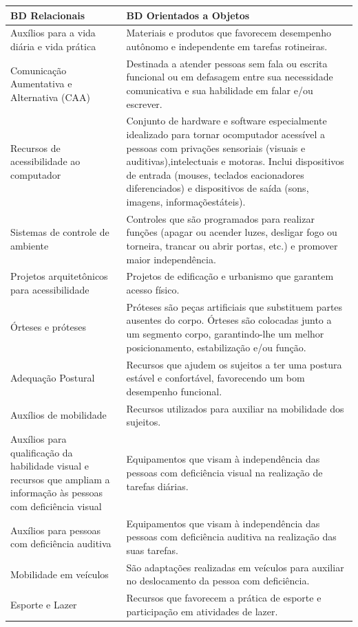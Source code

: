 \documentclass[
	12pt,			%
	openright,		%
	oneside,			%
	a4paper,			%
	chapter=TITLE,		%
	english,			%
	brazil,			%
	]{abntex2}
\begin{document}
{\centering
\footnotesize
\begin{tabular}{|p{7cm}|p{7cm}|}
\hline
\textbf{BD Relacionais} & \textbf{BD Orientados a Objetos} \\
\hline
Auxílios para a vida diária e vida prática & Materiais e produtos que favorecem desempenho autônomo e independente em tarefas rotineiras.\\
\hline
Comunicação Aumentativa e Alternativa (CAA) & Destinada a atender pessoas sem fala ou escrita funcional ou em defasagem entre sua necessidade comunicativa e sua habilidade em falar e/ou escrever.\\
\hline
Recursos de acessibilidade ao computador & Conjunto de hardware e software especialmente idealizado para tornar ocomputador acessível a pessoas com privações sensoriais (visuais e auditivas),intelectuais e motoras. Inclui dispositivos de entrada (mouses, teclados eacionadores diferenciados) e dispositivos de saída (sons, imagens, informaçõestáteis).\\
\hline
Sistemas de controle de ambiente & Controles que são programados para realizar funções (apagar ou acender luzes, desligar fogo ou torneira, trancar ou abrir portas, etc.) e promover maior independência.\\
\hline
Projetos arquitetônicos para acessibilidade & Projetos de edificação e urbanismo que garantem acesso físico.\\
\hline
Órteses e próteses & Próteses são peças artificiais que substituem partes ausentes do corpo. Órteses são colocadas junto a um segmento corpo, garantindo-lhe um melhor posicionamento, estabilização e/ou função.\\
\hline
Adequação Postural & Recursos que ajudem os sujeitos a ter uma postura estável e confortável, favorecendo um bom desempenho funcional.\\
\hline
Auxílios de mobilidade & Recursos utilizados para auxiliar na mobilidade dos sujeitos.\\
\hline
Auxílios para qualificação da habilidade visual e recursos que ampliam a informação às pessoas com deficiência visual & Equipamentos que visam à independência das pessoas com deficiência visual na realização de tarefas diárias.\\
\hline
Auxílios para pessoas com deficiência auditiva & Equipamentos que visam à independência das pessoas com deficiência auditiva na realização das suas tarefas.\\
\hline
Mobilidade em veículos & São adaptações realizadas em veículos para auxiliar no deslocamento da pessoa com deficiência.\\
\hline
Esporte e Lazer &Recursos que favorecem a prática de esporte e participação em atividades de lazer.\\
\hline
\end{tabular}
}
\end{document}
